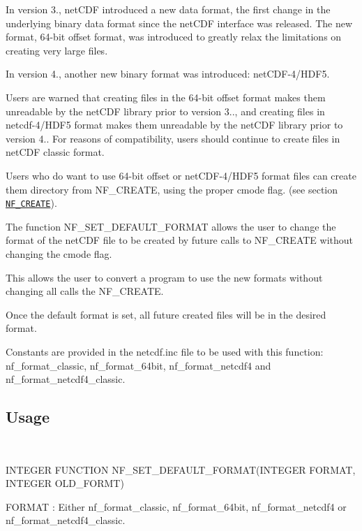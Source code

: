 In version 3., net\+C\+DF introduced a new data format, the first change in the underlying binary data format since the net\+C\+DF interface was released. The new format, 64-\/bit offset format, was introduced to greatly relax the limitations on creating very large files.

In version 4., another new binary format was introduced\+: net\+C\+D\+F-\/4/\+H\+D\+F5.

Users are warned that creating files in the 64-\/bit offset format makes them unreadable by the net\+C\+DF library prior to version 3.., and creating files in netcdf-\/4/\+H\+D\+F5 format makes them unreadable by the net\+C\+DF library prior to version 4.. For reasons of compatibility, users should continue to create files in net\+C\+DF classic format.

Users who do want to use 64-\/bit offset or net\+C\+D\+F-\/4/\+H\+D\+F5 format files can create them directory from N\+F\+\_\+\+C\+R\+E\+A\+TE, using the proper cmode flag. (see section \href{#NF_005fCREATE}{\tt N\+F\+\_\+\+C\+R\+E\+A\+TE}).

The function N\+F\+\_\+\+S\+E\+T\+\_\+\+D\+E\+F\+A\+U\+L\+T\+\_\+\+F\+O\+R\+M\+AT allows the user to change the format of the net\+C\+DF file to be created by future calls to N\+F\+\_\+\+C\+R\+E\+A\+TE without changing the cmode flag.

This allows the user to convert a program to use the new formats without changing all calls the N\+F\+\_\+\+C\+R\+E\+A\+TE.

Once the default format is set, all future created files will be in the desired format.

Constants are provided in the netcdf.\+inc file to be used with this function\+: nf\+\_\+format\+\_\+classic, nf\+\_\+format\+\_\+64bit, nf\+\_\+format\+\_\+netcdf4 and nf\+\_\+format\+\_\+netcdf4\+\_\+classic.

\subsection*{Usage }

 

I\+N\+T\+E\+G\+ER F\+U\+N\+C\+T\+I\+ON N\+F\+\_\+\+S\+E\+T\+\_\+\+D\+E\+F\+A\+U\+L\+T\+\_\+\+F\+O\+R\+M\+A\+T(\+I\+N\+T\+E\+G\+E\+R F\+O\+R\+M\+A\+T, I\+N\+T\+E\+G\+E\+R O\+L\+D\+\_\+\+F\+O\+R\+M\+T)

{\ttfamily F\+O\+R\+M\+AT} \+: Either nf\+\_\+format\+\_\+classic, nf\+\_\+format\+\_\+64bit, nf\+\_\+format\+\_\+netcdf4 or nf\+\_\+format\+\_\+netcdf4\+\_\+classic.

